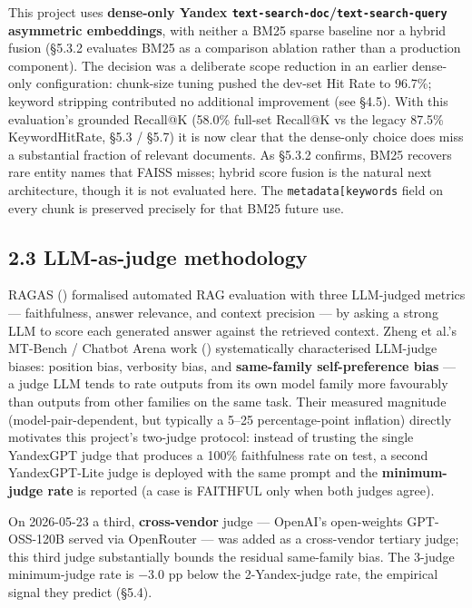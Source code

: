 \documentclass[
  american,
  a4paper,
]{article}
\begin{document}
This project uses \textbf{dense-only Yandex
\texttt{text-search-doc}/\texttt{text-search-query} asymmetric
embeddings}, with neither a BM25 sparse baseline nor a hybrid fusion
(§5.3.2 evaluates BM25 as a comparison ablation rather than a production
component). The decision was a deliberate scope reduction in an earlier
dense-only configuration: chunk-size tuning pushed the dev-set Hit Rate
to 96.7\%; keyword stripping contributed no additional improvement (see
§4.5). With this evaluation's grounded Recall@K (58.0\% full-set
Recall@K vs the legacy 87.5\% KeywordHitRate, §5.3 / §5.7) it is now
clear that the dense-only choice does miss a substantial fraction of
relevant documents. As §5.3.2 confirms, BM25 recovers rare entity names
that FAISS misses; hybrid score fusion is the natural next architecture,
though it is not evaluated here. The
\texttt{metadata{[}\textquotesingle{}keywords\textquotesingle{}{]}}
field on every chunk is preserved precisely for that BM25 future use.

\subsection{2.3 LLM-as-judge
methodology}\label{llm-as-judge-methodology}

RAGAS () formalised automated
RAG evaluation with three LLM-judged metrics --- faithfulness, answer
relevance, and context precision --- by asking a strong LLM to score
each generated answer against the retrieved context. Zheng et al.'s
MT-Bench / Chatbot Arena work () systematically characterised LLM-judge biases: position
bias, verbosity bias, and \textbf{same-family self-preference bias} ---
a judge LLM tends to rate outputs from its own model family more
favourably than outputs from other families on the same task. Their
measured magnitude (model-pair-dependent, but typically a 5--25
percentage-point inflation) directly motivates this project's two-judge
protocol: instead of trusting the single YandexGPT judge that produces a
100\% faithfulness rate on test, a second YandexGPT-Lite judge is
deployed with the same prompt and the \textbf{minimum-judge rate} is
reported (a case is FAITHFUL only when both judges agree).

On 2026-05-23 a third, \textbf{cross-vendor} judge --- OpenAI's
open-weights GPT-OSS-120B served via OpenRouter --- was added as a
cross-vendor tertiary judge; this third judge substantially bounds the
residual same-family bias. The 3-judge minimum-judge rate is −3.0 pp
below the 2-Yandex-judge rate, the empirical signal they predict (§5.4).
\end{document}
